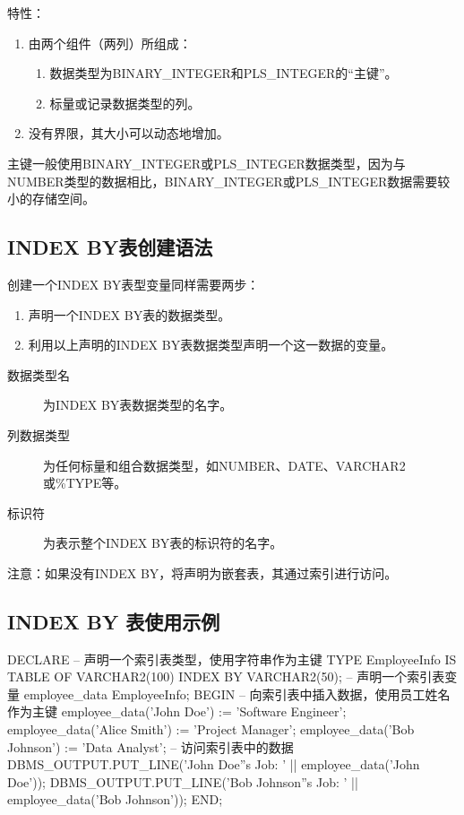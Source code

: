 \documentclass[11pt, a4paper, oneside, UTF8]{ctexbook}
\begin{document}
特性：
\begin{enumerate}
  \item 由两个组件（两列）所组成：
  \begin{enumerate}
    \item 数据类型为BINARY\_INTEGER和PLS\_INTEGER的“主键”。
    \item 标量或记录数据类型的列。
  \end{enumerate}
  \item 没有界限，其大小可以动态地增加。
\end{enumerate}

主键一般使用BINARY\_INTEGER或PLS\_INTEGER数据类型，因为与NUMBER类型的数据相比，BINARY\_INTEGER或PLS\_INTEGER数据需要较小的存储空间。

\subsection{INDEX BY表创建语法}
创建一个INDEX BY表型变量同样需要两步：
\begin{enumerate}
  \item 声明一个INDEX BY表的数据类型。
  \item 利用以上声明的INDEX BY表数据类型声明一个这一数据的变量。
\end{enumerate}


\begin{description}
  \item[数据类型名] 为INDEX BY表数据类型的名字。
  \item[列数据类型] 为任何标量和组合数据类型，如NUMBER、DATE、VARCHAR2或\%TYPE等。
  \item[标识符] 为表示整个INDEX BY表的标识符的名字。
\end{description}

注意：如果没有INDEX BY，将声明为嵌套表，其通过索引进行访问。

\subsection{INDEX BY 表使用示例}
\begin{plsql}[caption=INDEX BY表使用示例1]
DECLARE
  -- 声明一个索引表类型，使用字符串作为主键
  TYPE EmployeeInfo IS TABLE OF VARCHAR2(100) INDEX BY VARCHAR2(50);
  -- 声明一个索引表变量
  employee_data EmployeeInfo;
BEGIN
  -- 向索引表中插入数据，使用员工姓名作为主键
  employee_data('John Doe') := 'Software Engineer';
  employee_data('Alice Smith') := 'Project Manager';
  employee_data('Bob Johnson') := 'Data Analyst';
  -- 访问索引表中的数据
  DBMS_OUTPUT.PUT_LINE('John Doe''s Job: ' || employee_data('John Doe'));
  DBMS_OUTPUT.PUT_LINE('Bob Johnson''s Job: ' || employee_data('Bob Johnson'));
END;
\end{plsql}
\end{document}

